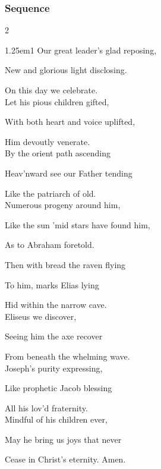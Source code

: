 
\subsubsection{Sequence}
\begin{multicols}{2}
\begin{hangparas}{1.25em}{1}
Our great leader's glad reposing,

New and glorious light disclosing.

On this day we celebrate.\\

Let his pious children gifted,

With both heart and voice uplifted,

Him devoutly venerate.\\

By the orient path ascending

Heav'nward see our Father tending

Like the patriarch of old.\\

Numerous progeny around him,

Like the sun 'mid stars have found him,

As to Abraham foretold.%

Then with bread the raven flying

To him, marks Elias lying

Hid within the narrow cave.\\

Eliseus we discover,

Seeing him the axe recover

From beneath the whelming wave.\\

Joseph's purity expressing,

Like prophetic Jacob blessing

All his lov'd fraternity.\\

Mindful of his children ever,

May he bring us joys that never

Cease in Christ's eternity. Amen.\\%
\end{hangparas}
\end{multicols}


